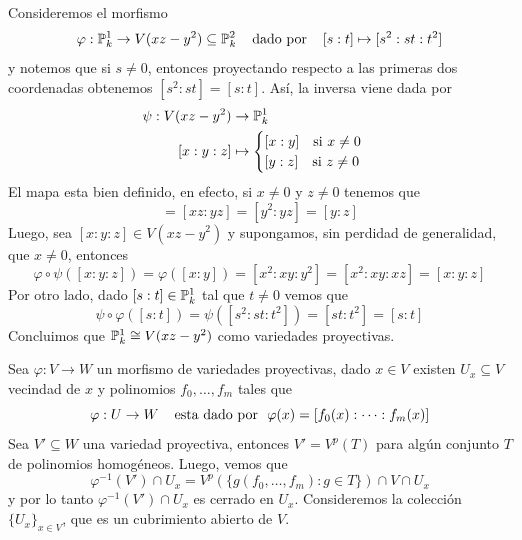 \documentclass[11pt]{article}
\begin{document}
\begin{ejm}
    Consideremos el morfismo
    \begin{equation*}
        \varphi:\P_{k}^{1} \to V(xz-y^{2})\subseteq\P_{k}^{2}
        \hhtext{dado por} [s:t] \mapsto [s^{2}:st:t^{2}]
    \end{equation*}
    y notemos que si $s\neq0$, entonces proyectando respecto a las primeras dos coordenadas 
    obtenemos $[s^{2}:st]=[s:t]$. Así, la inversa viene dada por
    \begin{align*}
        \psi:V(xz-y^{2}) &\to \P_{k}^{1} \\
        [x:y:z] &\mapsto 
        \begin{cases}
            [x:y] \quad\text{si }x\neq0 \\
            [y:z] \quad\text{si }z\neq0
        \end{cases}
    \end{align*}
    El mapa esta bien definido, en efecto, si $x\neq0$ y $z\neq0$ tenemos que
    \begin{equation*}
        [x:y]=[xz:yz]=[y^{2}:yz]=[y:z]
    \end{equation*}
    Luego, sea $[x:y:z]\in V(xz-y^{2})$ y supongamos, sin perdidad de generalidad, que $x\neq0$, 
    entonces
    \begin{equation*}
        \varphi\circ\psi([x:y:z])=\varphi([x:y])=[x^{2}:xy:y^{2}]=[x^{2}:xy:xz]=[x:y:z]
    \end{equation*}
    Por otro lado, dado $[s:t]\in\P_{k}^{1}$ tal que $t\neq0$ vemos que
    \begin{equation*}
        \psi\circ\varphi([s:t])=\psi([s^{2}:st:t^{2}])=[st:t^{2}]=[s:t]
    \end{equation*}
    Concluimos que $\P_{k}^{1}\cong V(xz-y^{2})$ como variedades proyectivas.
\end{ejm}

\newpage
\noindent Sea $\varphi:V\to W$ un morfismo de variedades proyectivas, dado $x\in V$ existen 
$U_{x}\subseteq V$ vecindad de $x$ y polinomios $f_{0},\dots,f_{m}$ tales que
\begin{equation*}
    \varphi:U\to W \htext{esta dado por } \varphi(x)=[f_{0}(x):\dots:f_{m}(x)]
\end{equation*}
Sea $V'\subseteq W$ una variedad proyectiva, entonces $V'=V^{p}(T)$ para algún conjunto $T$ de 
polinomios homogéneos. Luego, vemos que
\begin{equation*}
    \varphi^{-1}(V')\cap U_{x}=V^{p}(\{g(f_{0},\dots,f_{m}):g\in T\})\cap V\cap U_{x}
\end{equation*}
y por lo tanto $\varphi^{-1}(V')\cap U_{x}$ es cerrado en $U_{x}$. Consideremos la colección 
$\{U_{x}\}_{x\in V}$, que es un cubrimiento abierto de $V$.
\end{document}
